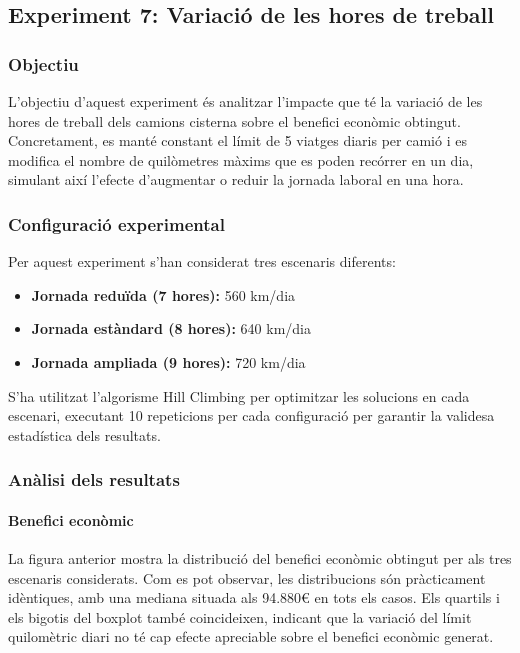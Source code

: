 \subsection{Experiment 7: Variació de les hores de treball}

\subsubsection{Objectiu}

L'objectiu d'aquest experiment és analitzar l'impacte que té la variació de les hores de treball dels camions cisterna sobre el benefici econòmic obtingut. Concretament, es manté constant el límit de 5 viatges diaris per camió i es modifica el nombre de quilòmetres màxims que es poden recórrer en un dia, simulant així l'efecte d'augmentar o reduir la jornada laboral en una hora.

\subsubsection{Configuració experimental}

Per aquest experiment s'han considerat tres escenaris diferents:

\begin{itemize}
    \item \textbf{Jornada reduïda (7 hores):} 560 km/dia
    \item \textbf{Jornada estàndard (8 hores):} 640 km/dia
    \item \textbf{Jornada ampliada (9 hores):} 720 km/dia
\end{itemize}

S'ha utilitzat l'algorisme Hill Climbing per optimitzar les solucions en cada escenari, executant 10 repeticions per cada configuració per garantir la validesa estadística dels resultats.

\subsubsection{Anàlisi dels resultats}

\paragraph{Benefici econòmic}



La figura anterior mostra la distribució del benefici econòmic obtingut per als tres escenaris considerats. Com es pot observar, les distribucions són pràcticament idèntiques, amb una mediana situada als 94.880€ en tots els casos. Els quartils i els bigotis del boxplot també coincideixen, indicant que la variació del límit quilomètric diari no té cap efecte apreciable sobre el benefici econòmic generat.

